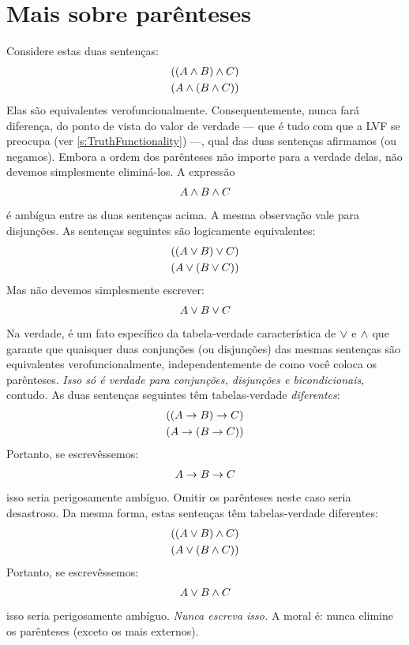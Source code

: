 \section{Mais sobre parênteses}\label{s:MoreBracketingConventions}
Considere estas duas sentenças:
	\begin{align*}
		((A \wedge B) \wedge C)\\
		(A \wedge (B \wedge C))
	\end{align*}
Elas são equivalentes verofuncionalmente. Consequentemente, nunca fará diferença, do ponto de vista do valor de verdade — que é tudo com que a LVF se preocupa (ver \cref{s:TruthFunctionality}) —, qual das duas sentenças afirmamos (ou negamos). Embora a ordem dos parênteses não importe para a verdade delas, não devemos simplesmente eliminá-los. A expressão
	\begin{align*}
		A \wedge B \wedge C
	\end{align*}
é ambígua entre as duas sentenças acima. A mesma observação vale para disjunções. As sentenças seguintes são logicamente equivalentes:
	\begin{align*}
		((A \vee B) \vee C)\\
		(A \vee (B \vee C))
	\end{align*}
Mas não devemos simplesmente escrever:
	\begin{align*}
		A \vee B \vee C
	\end{align*}
Na verdade, é um fato específico da tabela-verdade característica de
$\vee$ e $\wedge$ que garante que quaisquer duas conjunções (ou
disjunções) das mesmas sentenças são equivalentes verofuncionalmente,
independentemente de como você coloca os parênteses. \emph{Isso só é
verdade para conjunções, disjunções e bicondicionais}, contudo. As duas
sentenças seguintes têm tabelas-verdade \emph{diferentes}:
	\begin{align*}
		((A \rightarrow B) \rightarrow C)\\
		(A \rightarrow (B \rightarrow C))
	\end{align*}
Portanto, se escrevêssemos:
	\begin{align*}
		A \rightarrow B \rightarrow C
	\end{align*}
isso seria perigosamente ambíguo. Omitir os parênteses neste caso seria desastroso. Da mesma forma, estas sentenças têm tabelas-verdade diferentes:
	\begin{align*}
		((A \vee B) \wedge C)\\
		(A \vee (B \wedge C))
	\end{align*}
Portanto, se escrevêssemos:
	\begin{align*}
		A \vee B \wedge C
	\end{align*}
isso seria perigosamente ambíguo. \emph{Nunca escreva isso.} A moral é: nunca elimine os parênteses (exceto os mais externos).

